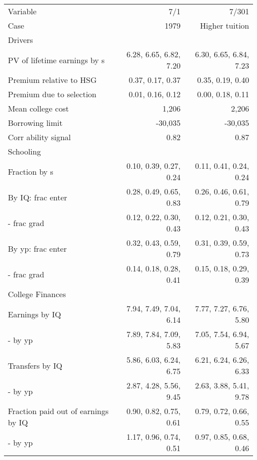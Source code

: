 \begin{tabular}{lrr}
\hline
Variable & 7/1  & 7/301  \\ 
Case & 1979  & Higher tuition  \\ 
Drivers &   &   \\ 
PV of lifetime earnings by s & 6.28, 6.65, 6.82, 7.20  & 6.30, 6.65, 6.84, 7.23  \\ 
Premium relative to HSG & 0.37, 0.17, 0.37  & 0.35, 0.19, 0.40  \\ 
Premium due to selection & 0.01, 0.16, 0.12  & 0.00, 0.18, 0.11  \\ 
Mean college cost & 1,206  & 2,206  \\ 
Borrowing limit & -30,035  & -30,035  \\ 
Corr ability signal & 0.82  & 0.87  \\ 
\hline
Schooling &   &   \\ 
Fraction by s & 0.10, 0.39, 0.27, 0.24  & 0.11, 0.41, 0.24, 0.24  \\ 
By IQ: frac enter & 0.28, 0.49, 0.65, 0.83  & 0.26, 0.46, 0.61, 0.79  \\ 
- frac grad & 0.12, 0.22, 0.30, 0.43  & 0.12, 0.21, 0.30, 0.43  \\ 
By yp: frac enter & 0.32, 0.43, 0.59, 0.79  & 0.31, 0.39, 0.59, 0.73  \\ 
- frac grad & 0.14, 0.18, 0.28, 0.41  & 0.15, 0.18, 0.29, 0.39  \\ 
\hline
College Finances &   &   \\ 
Earnings by IQ & 7.94, 7.49, 7.04, 6.14  & 7.77, 7.27, 6.76, 5.80  \\ 
- by yp & 7.89, 7.84, 7.09, 5.83  & 7.05, 7.54, 6.94, 5.67  \\ 
Transfers by IQ & 5.86, 6.03, 6.24, 6.75  & 6.21, 6.24, 6.26, 6.33  \\ 
- by yp & 2.87, 4.28, 5.56, 9.45  & 2.63, 3.88, 5.41, 9.78  \\ 
Fraction paid out of earnings by IQ & 0.90, 0.82, 0.75, 0.61  & 0.79, 0.72, 0.66, 0.55  \\ 
- by yp & 1.17, 0.96, 0.74, 0.51  & 0.97, 0.85, 0.68, 0.46  \\ 
\hline
\end{tabular}%
